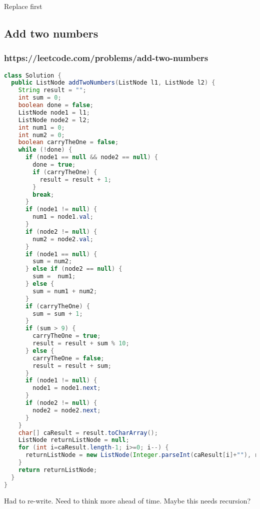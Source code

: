 \documentclass[12pt]{article}
\begin{document}
Replace first

\subsection{Add two numbers} 
\subsubsection{https://leetcode.com/problems/add-two-numbers}
\begin{lstlisting}[language=Java]
class Solution {
  public ListNode addTwoNumbers(ListNode l1, ListNode l2) {
    String result = "";
    int sum = 0;
    boolean done = false;
    ListNode node1 = l1;
    ListNode node2 = l2;
    int num1 = 0;
    int num2 = 0;
    boolean carryTheOne = false;
    while (!done) {
      if (node1 == null && node2 == null) {
        done = true;
        if (carryTheOne) {
          result = result + 1;
        }
        break;
      }            
      if (node1 != null) {
        num1 = node1.val;
      }
      if (node2 != null) {
        num2 = node2.val;
      }
      if (node1 == null) {
        sum = num2;
      } else if (node2 == null) {
        sum =  num1;
      } else {
        sum = num1 + num2;
      }
      if (carryTheOne) {
        sum = sum + 1;
      }
      if (sum > 9) {
        carryTheOne = true;
        result = result + sum % 10;
      } else {
        carryTheOne = false;
        result = result + sum;
      }
      if (node1 != null) {
        node1 = node1.next;
      }
      if (node2 != null) {
        node2 = node2.next;
      }
    }
    char[] caResult = result.toCharArray();
    ListNode returnListNode = null;
    for (int i=caResult.length-1; i>=0; i--) {
      returnListNode = new ListNode(Integer.parseInt(caResult[i]+""), returnListNode);
    }
    return returnListNode;
  }
}
\end{lstlisting}

Had to re-write. Need to think more ahead of time. Maybe this needs recursion?
\end{document}
